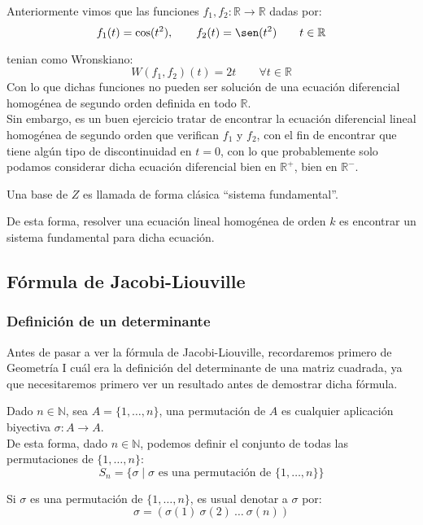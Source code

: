 \begin{ejemplo}
    Anteriormente vimos que las funciones $f_1,f_2:\mathbb{R}\rightarrow\mathbb{R}$ dadas por:
    \begin{equation*}
        f_1(t) = \cos(t^2), \qquad f_2(t) = \sen(t^2) \qquad t\in \mathbb{R}
    \end{equation*}

    tenian como Wronskiano:
    \begin{equation*}
        W(f_1,f_2)(t) = 2t \qquad \forall t\in \mathbb{R}
    \end{equation*}
    Con lo que dichas funciones no pueden ser solución de una ecuación diferencial homogénea de segundo orden definida en todo $\mathbb{R}$.\\

    Sin embargo, es un buen ejercicio tratar de encontrar la ecuación diferencial lineal homogénea de segundo orden que verifican $f_1$ y $f_2$, con el fin de encontrar que tiene algún tipo de discontinuidad en $t=0$, con lo que probablemente solo podamos considerar dicha ecuación diferencial bien en $\mathbb{R}^+$, bien en $\mathbb{R}^-$.
\end{ejemplo}

\begin{definicion}
    Una base de $Z$ es llamada de forma clásica ``sistema fundamental''.
\end{definicion}
De esta forma, resolver una ecuación lineal homogénea de orden $k$ es encontrar un sistema fundamental para dicha ecuación.

\subsection{Fórmula de Jacobi-Liouville}
\subsubsection{Definición de un determinante}
Antes de pasar a ver la fórmula de Jacobi-Liouville, recordaremos primero de Geometría I cuál era la definición del determinante de una matriz cuadrada, ya que necesitaremos primero ver un resultado antes de demostrar dicha fórmula.
\begin{definicion}[Permutación]
    Dado $n\in \mathbb{N}$, sea $A=\{1,\ldots,n\}$, una permutación de $A$ es cualquier aplicación biyectiva $\sigma:A\rightarrow A$.\\

    De esta forma, dado $n\in \mathbb{N}$, podemos definir el conjunto de todas las permutaciones de $\{1,\ldots,n\}$:
    \begin{equation*}
        S_n = \{\sigma \mid \sigma \text{\ es una permutación de\ } \{1,\ldots,n\}\}
    \end{equation*}
\end{definicion}
\begin{notacion}
Si $\sigma$ es una permutación de $\{1,\ldots,n\}$, es usual denotar a $\sigma$ por:
\begin{equation*}
    \sigma = (\sigma(1)\ \sigma(2)\ \dots\ \sigma(n))
\end{equation*}
\end{notacion}

